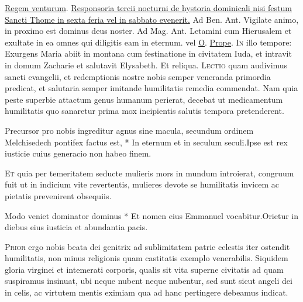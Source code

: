 \begin{multicols*}{2}
 \hyperlink{regem-venturum}{Regem venturum}.
\newline \ul{Responsoria tercii nocturni de hystoria dominicali nisi festum Sancti Thome in sexta feria vel in sabbato evenerit.} {\color{Red} Ad Ben. Ant.} Vigilate animo, in proximo est dominus deus noster. {\color{Red} Ad Mag. Ant.} Letamini cum Hierusalem et exultate in ea omnes qui diligitis eam in eternum. {\color{Red} vel} \hyperlink{o-antiphons}{O}.
 \hyperlink{prope-est-iam-invitatorium}{Prope}.
\lettrine[lines=2]{\zallmancaps \color{Blue} I}{n} illo tempore: Exurgens Maria abiit in montana cum festinatione in civitatem Iuda, et intravit in domum Zacharie et salutavit Elysabeth. Et reliqua.
\lettrine[lines=2]{\zallmancaps \color{Red} L}{ectio} quam audivimus sancti evangelii, et redemptionis nostre nobis semper veneranda primordia predicat, et salutaria semper imitande humilitatis remedia commendat. Nam quia peste superbie attactum genus humanum perierat, decebat ut medicamentum humilitatis quo sanaretur prima mox incipientis salutis tempora pretenderent.
\begin{responsory}
{Precursor pro nobis ingreditur agnus sine macula, secundum ordinem Melchisedech pontifex factus est, * In eternum et in seculum seculi.}{Ipse est rex iusticie cuius generacio non habeo finem.}
\end{responsory}
\lettrine[lines=2]{\zallmancaps \color{Blue} E}{t} quia per temeritatem seducte mulieris mors in mundum introierat, congruum fuit ut in indicium vite revertentis, mulieres devote se humilitatis invicem ac pietatis prevenirent obsequiis.
\begin{responsory}
{Modo veniet dominator dominus * Et nomen eius Emmanuel vocabitur.}{Orietur in diebus eius iusticia et abundantia pacis.}
\end{responsory}
\lettrine[lines=2]{\zallmancaps \color{Red} P}{rior} ergo nobis beata dei genitrix ad sublimitatem patrie celestis iter ostendit humilitatis, non minus religionis quam castitatis exemplo venerabilis. Siquidem gloria virginei et intemerati corporis, qualis sit vita superne civitatis ad quam suspiramus insinuat, ubi neque nubent neque nubentur, sed sunt sicut angeli dei in celis, ac virtutem mentis eximiam qua ad hanc pertingere debeamus indicat.

\end{multicols*}
